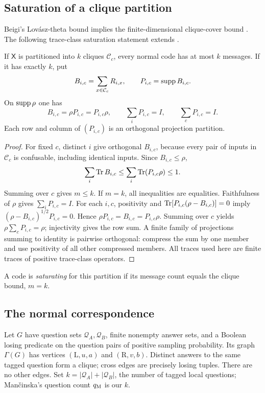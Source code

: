 \subsection{Saturation of a clique partition}
Beigi's Lov\'asz-theta bound implies the finite-dimensional clique-cover bound \cite{Beigi}. The following trace-class saturation statement extends \cite[Lemma~5]{Mancinska}.
\begin{lemma}\label{lem:saturation}
If $\mathsf X$ is partitioned into $k$ cliques $\mathcal C_c$, every normal code has at most $k$ messages. If it has exactly $k$, put
\[
 B_{i,c}=\sum_{x\in \mathcal C_c}R_{i,x},\qquad P_{i,c}=\operatorname{supp} B_{i,c}.
\]
On $\operatorname{supp}\rho$ one has
\begin{equation}\label{eq:saturation}
 B_{i,c}=\rho P_{i,c}=P_{i,c}\rho,\qquad
 \sum_iP_{i,c}=I,\qquad \sum_cP_{i,c}=I.
\end{equation}
Each row and column of $(P_{i,c})$ is an orthogonal projection partition.
\end{lemma}
\begin{proof}
For fixed $c$, distinct $i$ give orthogonal $B_{i,c}$, because every pair of inputs in $\mathcal C_c$ is confusable, including identical inputs. Since $B_{i,c}\leq\rho$,
\[
 \sum_i\operatorname{Tr} B_{i,c}\leq\sum_i\operatorname{Tr}(P_{i,c}\rho)\leq1.
\]
Summing over $c$ gives $m\leq k$. If $m=k$, all inequalities are equalities. Faithfulness of $\rho$ gives $\sum_iP_{i,c}=I$. For each $i,c$, positivity and $\operatorname{Tr}[P_{i,c}(\rho-B_{i,c})]=0$ imply $(\rho-B_{i,c})^{1/2}P_{i,c}=0$. Hence $\rho P_{i,c}=B_{i,c}=P_{i,c}\rho$. Summing over $c$ yields $\rho\sum_cP_{i,c}=\rho$; injectivity gives the row sum. A finite family of projections summing to identity is pairwise orthogonal: compress the sum by one member and use positivity of all other compressed members. All traces used here are finite traces of positive trace-class operators.
\end{proof}

A code is \emph{saturating} for this partition if its message count equals the clique bound, $m=k$.

\subsection{The normal correspondence}
Let $G$ have question sets $\mathcal Q_A,\mathcal Q_B$, finite nonempty answer sets, and a Boolean losing predicate on the question pairs of positive sampling probability. Its graph $\Gamma(G)$ has vertices $(\mathrm L,u,a)$ and $(\mathrm R,v,b)$. Distinct answers to the same tagged question form a clique; cross edges are precisely losing tuples. There are no other edges. Set $k=|\mathcal Q_A|+|\mathcal Q_B|$, the number of tagged local questions; Man\v{c}inska's question count $q_{\rm M}$ is our $k$.

